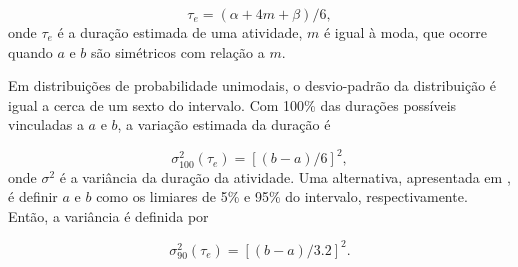 \begin{equation}
\label{eq:mediaPERT}
\tau_e = (\alpha + 4m + \beta) / 6 , 
\end{equation}
onde $\tau_e$ \label{symbol:mediaPERT} é a duração estimada de uma atividade, $m$ é igual à moda, que ocorre quando $a$ e $b$ são simétricos com relação a $m$.

Em distribuições de probabilidade unimodais, o desvio-padrão da distribuição é igual a cerca de um sexto do intervalo. Com  100\% das durações possíveis vinculadas a $a$ e $b$, a variação estimada da duração é

\begin{equation}
\label{eq:varianciaPERT}
\sigma^2_{100}(\tau_e) = [(b - a) / 6]^2  , 
\end{equation}
onde $\sigma^2$ \label{symbol:varianciaPERT} é a variância da duração da atividade. Uma alternativa, apresentada em \cite{cottrell1999simplified}, é definir $a$ e $b$ como os limiares de 5\% e 95\% do intervalo, respectivamente. Então, a variância é definida por

\begin{equation}
\label{eq:variancia2PERT}
\sigma^2_{90}(\tau_e) = [(b - a) / 3.2]^2  .
\end{equation}

